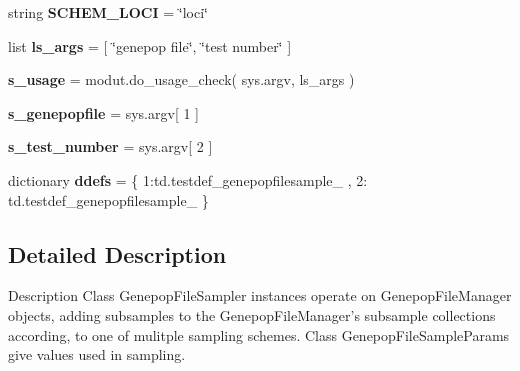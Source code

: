 \begin{DoxyCompactItemize}
\item 
string {\bfseries S\+C\+H\+E\+M\+\_\+\+L\+O\+CI} = \char`\"{}loci\char`\"{}\hypertarget{namespacenegui_1_1genepopfilesampler_a389ea2c8351b6c9f6a405cb2c4a1fff4}{}\label{namespacenegui_1_1genepopfilesampler_a389ea2c8351b6c9f6a405cb2c4a1fff4}

\item 
list {\bfseries ls\+\_\+args} = \mbox{[} \char`\"{}genepop file\char`\"{}, \char`\"{}test number\char`\"{} \mbox{]}\hypertarget{namespacenegui_1_1genepopfilesampler_af0949cf58ac4626034b74cc9feaf35de}{}\label{namespacenegui_1_1genepopfilesampler_af0949cf58ac4626034b74cc9feaf35de}

\item 
{\bfseries s\+\_\+usage} = modut.\+do\+\_\+usage\+\_\+check( sys.\+argv, ls\+\_\+args )\hypertarget{namespacenegui_1_1genepopfilesampler_a50569ca2f7b58beeb1163ff3e3578bc6}{}\label{namespacenegui_1_1genepopfilesampler_a50569ca2f7b58beeb1163ff3e3578bc6}

\item 
{\bfseries s\+\_\+genepopfile} = sys.\+argv\mbox{[} 1 \mbox{]}\hypertarget{namespacenegui_1_1genepopfilesampler_a950ccfdc83d7493167c08843392ce46c}{}\label{namespacenegui_1_1genepopfilesampler_a950ccfdc83d7493167c08843392ce46c}

\item 
{\bfseries s\+\_\+test\+\_\+number} = sys.\+argv\mbox{[} 2 \mbox{]}\hypertarget{namespacenegui_1_1genepopfilesampler_adc2001c9e9a7d948254b3cdc332a6977}{}\label{namespacenegui_1_1genepopfilesampler_adc2001c9e9a7d948254b3cdc332a6977}

\item 
dictionary {\bfseries ddefs} = \{ 1\+:td.\+testdef\+\_\+genepopfilesample\+\_ , 2\+: td.\+testdef\+\_\+genepopfilesample\+\_ \}\hypertarget{namespacenegui_1_1genepopfilesampler_a05caff4e04dff14a4594c4696dbd2496}{}\label{namespacenegui_1_1genepopfilesampler_a05caff4e04dff14a4594c4696dbd2496}

\end{DoxyCompactItemize}


\subsection{Detailed Description}
\begin{DoxyVerb}Description
Class GenepopFileSampler instances operate on GenepopFileManager objects,
adding subsamples to the GenepopFileManager's subsample collections according,
to one of mulitple sampling schemes.  Class GenepopFileSampleParams give 
values used in sampling.
\end{DoxyVerb}
 